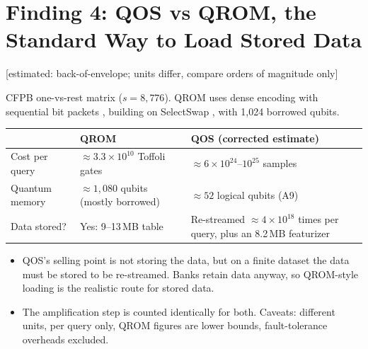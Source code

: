 \documentclass[10pt]{article}
\newcommand{\evlabel}[1]{\textsf{\small[#1]}}
\newenvironment{sectionblock}
{%
    \par
    \vspace{2pt}
    \noindent
    \begin{minipage}{\textwidth}
}
{%
    \end{minipage}
    \par
    \vspace{5pt}
}
\begin{document}
\begin{sectionblock}

\section{Finding 4: QOS vs QROM, the Standard Way to Load Stored Data}
\label{sec:f4}

\evlabel{estimated: back-of-envelope; units differ, compare orders of magnitude only}

\vspace{2pt}
CFPB one-vs-rest matrix ($s=8{,}776$). QROM uses dense encoding with sequential bit packets \cite{motlagh2026dense,motlagh2026halving}, building on SelectSwap \cite{berry2019,low2024}, with 1{,}024 borrowed qubits.

\vspace{2pt}
\begin{center}
\small
\begin{tabularx}{\textwidth}{@{}lYY@{}}
\toprule
 & \textbf{QROM} & \textbf{QOS (corrected estimate)} \\
\midrule
Cost per query & $\approx 3.3\times10^{10}$ Toffoli gates & $\approx 6\times10^{24}$--$10^{25}$ samples \\
Quantum memory & $\approx 1{,}080$ qubits (mostly borrowed) & $\approx 52$ logical qubits (A9) \\
Data stored? & Yes: 9--13\,MB table & Re-streamed $\approx 4\times10^{18}$ times per query, plus an 8.2\,MB featurizer \\
\bottomrule
\end{tabularx}
\end{center}

\begin{itemize}
    \item QOS's selling point is not storing the data, but on a finite dataset the data must be stored to be re-streamed. Banks retain data anyway, so QROM-style loading is the realistic route for stored data.
    \item The amplification step is counted identically for both. Caveats: different units, per query only, QROM figures are lower bounds, fault-tolerance overheads excluded.
\end{itemize}

\end{sectionblock}
\end{document}
